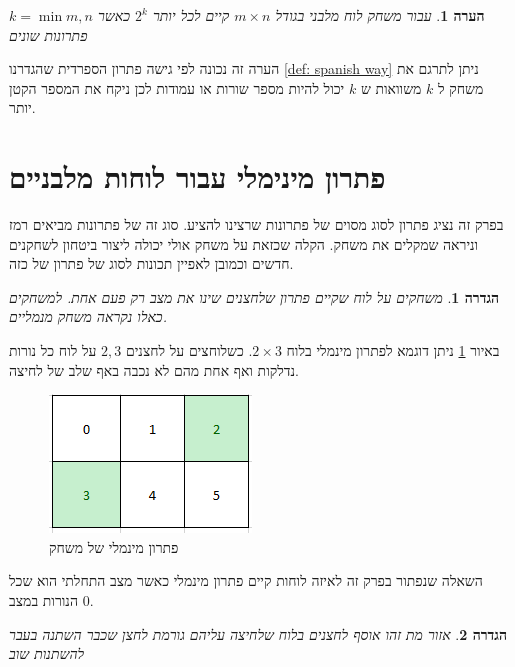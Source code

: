 \documentclass[12pt,twoside]{article}
\newtheorem{definition}{הגדרה}[section]
\newtheorem{comm}{הערה}[section]
\begin{document}
\begin{comm}
    עבור משחק לוח מלבני
    בגודל 
    $m \times n$
    קיים לכל יותר 
    $2^k$
    כאשר 
    $k = \min{m,n}$
    פתרונות שונים
\end{comm}
הערה זה נכונה לפי גישה פתרון הספרדית
שהגדרנו
\ref{def: spanish way}
ניתן לתרגם את משחק ל
$k$
משוואות 
ש
$k$
יכול להיות מספר שורות או עמודות 
לכן ניקח את המספר הקטן יותר.


\section{פתרון מינימלי עבור לוחות מלבניים}
בפרק זה נציג פתרון לסוג מסוים של פתרונות שרצינו להציע. סוג זה של פתרונות 
מביאים רמז וניראה שמקלים את משחק. הקלה שכזאת על משחק אולי 
יכולה ליצור ביטחון לשחקנים חדשים וכמובן לאפיין תכונות לסוג של פתרון של כזה.

\begin{definition}
משחקים על לוח שקיים פתרון שלחצנים 
שינו את מצב רק פעם אחת.
למשחקים כאלו נקראה משחק מנמליים.
\end{definition}

באיור 
\ref{fig: min sol 2x3}
ניתן דוגמא לפתרון מינמלי 
בלוח 
$2 \times 3$.
כשלוחצים על לחצנים 
$2, 3$
על לוח כל נורות נדלקות ואף 
אחת מהם לא נכבה באף שלב של לחיצה.

\begin{figure}[ht]
    \caption{פתרון מינמלי של משחק}
    \label{fig: min sol 2x3}
    \unsethebrew
    \centering
    \includegraphics[width=.7\textwidth,height=.7\textheight,keepaspectratio]{images/min_sol_2x3.PNG}
\end{figure}
\sethebrew

השאלה שנפתור בפרק זה לאיזה לוחות קיים פתרון מינמלי כאשר מצב התחלתי הוא שכל הנורות במצב
$0$.

\begin{definition}
    \label{def: dead zone}
    אזור מת זהו אוסף לחצנים בלוח
    שלחיצה עליהם 
    גורמת לחצן שכבר השתנה בעבר להשתנות שוב
\end{definition}
\end{document}
